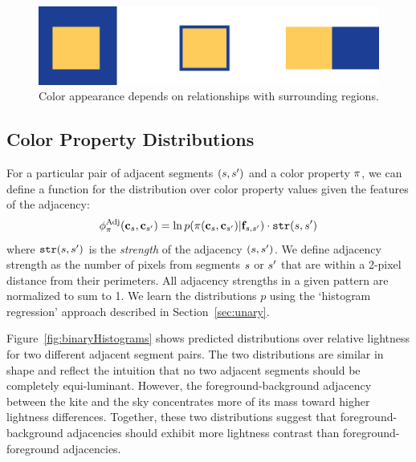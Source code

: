 \begin{figure}[ht]
\centering
\includegraphics[width=.7\columnwidth]{figs/surround}
\caption{Color appearance depends on relationships with surrounding regions.}
\label{fig:surround}
\end{figure}

\subsection{Color Property Distributions}
\label{sec:binaryDistribs}

For a particular pair of adjacent segments $(s, {s^{\prime}})$ and a color property $\pi$, we can define a function for the distribution over color property values given the features of the adjacency:
\begin{equation*}
\phi^{\textrm{Adj}}_\pi(\mathbf{c}_s, \mathbf{c}_{s^{\prime}}) = \ln p( \pi( \mathbf{c}_s, \mathbf{c}_{s^{\prime}} ) | \mathbf{f}_{s, {s^{\prime}}} ) \cdot \texttt{str}(s, {s^{\prime}})
\end{equation*}
where $\texttt{str}(s,{s^{\prime}})$ is the \emph{strength} of the adjacency $(s,{s^{\prime}})$. We define adjacency strength as the number of pixels from segments $s$ or ${s^{\prime}}$ that are within a 2-pixel distance from their perimeters. All adjacency strengths in a given pattern are normalized to sum to 1. We learn the distributions $p$ using the `histogram regression' approach described in Section~\ref{sec:unary}.

Figure~\ref{fig:binaryHistograms} shows predicted distributions over relative lightness for two different adjacent segment pairs. The two distributions are similar in shape and reflect the intuition that no two adjacent segments should be completely equi-luminant. However, the foreground-background adjacency between the kite and the sky concentrates more of its mass toward higher lightness differences. Together, these two distributions suggest that foreground-background adjacencies should exhibit more lightness contrast than foreground-foreground adjacencies.

